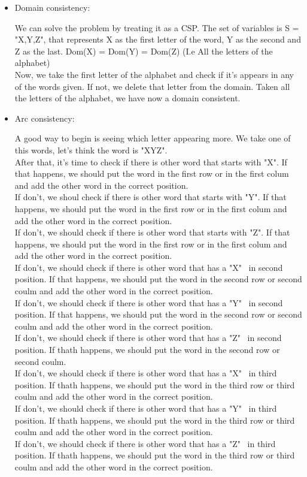 \documentclass[paper=a4, fontsize=11pt]{scrartcl} %
\numberwithin{equation}{section} %
\numberwithin{figure}{section} %
\numberwithin{table}{section} %
\begin{document}
 \begin{itemize}
 
 \item Domain consistency: 
 
We can solve the problem by treating it as a CSP. The set of variables is \newline S = "X,Y,Z", that represents X as the first letter of the word, Y as the second and Z as the last. Dom(X) = Dom(Y) = Dom(Z) (I.e All the letters of the alphabet)\\

Now, we take the first letter of the alphabet and check if it's appears in any of the words given. If not, we delete that letter from the domain. Taken all the letters of the alphabet, we have now a domain consistent.

 \item Arc consistency:
 
A good way to begin is seeing which letter appearing more. We take one of this words, let's think the word is "XYZ". \\

After that, it's time to check if there is other word that starts with "X". If that happens, we should put the word in the first row or in the first colum and add the other word in the correct position.\\
If don't, we shoul check if there is other word that starts with "Y". If that happens, we should put the word in the first row or in the first colum and add the other word in the correct position.\\
 If don't, we should check if there is other word that starts with "Z". If that happens, we should put the word in the first row or in the first colum and add the other word in the correct position. \\
  If don't, we should check if there is other word that has a "X" \ in second position. If that happens, we should put the word in the second row or second coulm and add the other word in the correct position. \\
 If don't, we should check if there is other word that has a "Y" \ in second position. If that happens, we should put the word in the second row or second coulm and add the other word in the correct position. \\
 If don't, we should check if there is other word that has a "Z" \ in second position. If thath happens, we should put the word in the second row or second coulm.\\
  If don't, we should check if there is other word that has a "X" \ in third position. If thath happens, we should put the word in the third row or third coulm and add the other word in the correct position.\\
 If don't, we should check if there is other word that has a "Y" \ in third position. If thath happens, we should put the word in the third row or third coulm and add the other word in the correct position.\\
  If don't, we should check if there is other word that has a "Z" \ in third position. If thath happens, we should put the word in the third row or third coulm and add the other word in the correct position.\\
  

\end{itemize}
\end{document}
